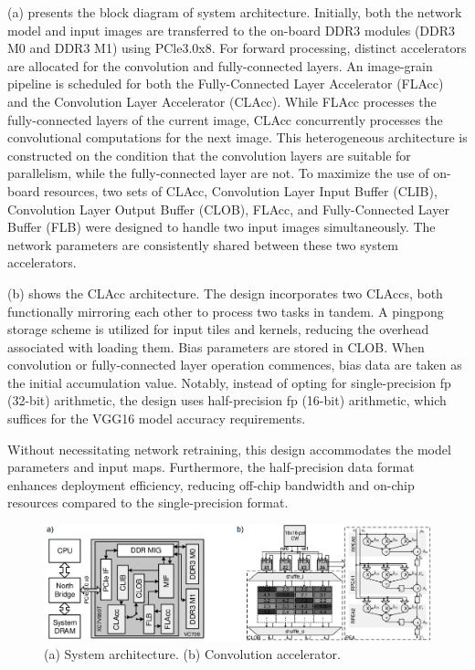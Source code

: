 (a) presents the block diagram of system architecture. Initially, both the network model and input images are transferred to the on-board DDR3 modules (DDR3 M0 and DDR3 M1) using PCle3.0x8. For forward processing, distinct accelerators are allocated for the convolution and fully-connected layers. An image-grain pipeline is scheduled for both the Fully-Connected Layer Accelerator (FLAcc) and the Convolution Layer Accelerator (CLAcc). While FLAcc processes the fully-connected layers of the current image, CLAcc concurrently processes the convolutional computations for the next image. This heterogeneous architecture is constructed on the condition that the convolution layers are suitable for parallelism, while the fully-connected layer are not. To maximize the use of on-board resources, two sets of CLAcc, Convolution Layer Input Buffer (CLIB), Convolution Layer Output Buffer (CLOB), FLAcc, and Fully-Connected Layer Buffer (FLB) were designed to handle two input images simultaneously. The network parameters are consistently shared between these two system accelerators.

(b) shows the CLAcc architecture. The design incorporates two CLAccs, both functionally mirroring each other to process two tasks in tandem. A pingpong storage scheme is utilized for input tiles and kernels, reducing the overhead associated with loading them. Bias parameters are stored in CLOB. When convolution or fully-connected layer operation commences, bias data are taken as the initial accumulation value. Notably, instead of opting for single-precision \gls{fp} (32-bit) arithmetic, the design uses half-precision \gls{fp} (16-bit) arithmetic, which suffices for the VGG16 model accuracy requirements.

Without necessitating network retraining, this design accommodates the model parameters and input maps. Furthermore, the half-precision data format enhances deployment efficiency, reducing off-chip bandwidth and on-chip resources compared to the single-precision format.

\begin{figure}[h!]
	\centering
	\includegraphics[width=\textwidth]{./figures/1_g.png}
	\caption{(a) System architecture. (b) Convolution accelerator.}
	\label{fig:mei2017200mhz}
\end{figure}
\FloatBarrier


